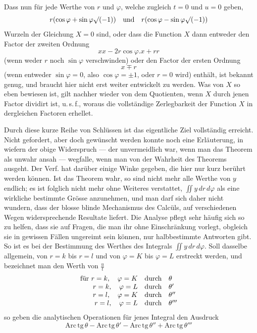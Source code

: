 Dass nun für jede Werthe von $r$ und $\varphi$, welche zugleich $t=0$
und $u=0$ geben,
\[
r(\cos\varphi+\sin\varphi\surd(-1))\quad\hbox{und}\quad
r(\cos\varphi-\sin\varphi\surd(-1))
\]
Wurzeln der Gleichung $X=0$ sind, oder dass die Function $X$ dann
entweder den Factor der zweiten Ordnung
\[
xx-2r\cos\varphi.x+rr
\]
(wenn weder $r$ noch $\sin\varphi$ verschwinden) oder den Factor der
ersten Ordnung
\[
x\mp r
\]
(wenn entweder $\sin\varphi=0$, also $\cos\varphi=\pm1$,
oder $r=0$ wird) enthält, ist bekannt genug, und braucht hier nicht erst
weiter entwickelt zu werden. Was von $X$ so eben bewiesen ist, gilt
nachher wieder von dem Quotienten, wenn $X$ durch jenen Factor dividirt
ist, u.\,s.\,f., woraus die vollständige Zerlegbarkeit der Function $X$ in
dergleichen Factoren erhellet.

Durch diese kurze Reihe von Schlüssen ist das eigentliche Ziel vollständig
erreicht. Nicht gefordert, aber doch gewünscht werden konnte noch eine
Erläuterung, in wiefern der obige Widerspruch --- der unvermeidlich war,
wenn man das Theorem als unwahr ansah --- wegfalle, wenn man von der
Wahrheit des Theorems ausgeht. Der Verf. hat darüber einige Winke gegeben,
die hier nur kurz berührt werden können. Ist das Theorem wahr, so sind
nicht mehr alle Werthe von $y$ endlich; es ist folglich nicht mehr ohne
Weiteres verstattet, $\iint y\,dr\,d\varphi$ als eine wirkliche bestimmte
Grösse anzunehmen, und man darf sich daher nicht wundern, dass der blosse
blinde Mechanismus des Calcüls, auf verschiedenen Wegen widersprechende
Resultate liefert. Die Analyse pflegt sehr häufig sich so zu helfen, dass
sie auf Fragen, die man ihr ohne Einschränkung vorlegt, obgleich sie in
gewissen Fällen ungereimt sein können, nur halbbestimmte Antworten gibt.
So ist es bei der Bestimmung des Werthes des Integrals $\iint y\,dr\,d\varphi$.
Soll dasselbe allgemein, von $r=k$ bis $r=l$ und von $\varphi=K$ bis
$\varphi=L$ erstreckt werden, und bezeichnet man den Werth von $\frac{u}{t}$
\[
\begin{array}{rcl}
\hbox{für }r=k,\quad\varphi=K&\hbox{durch}&\theta\\
r=k,\quad\varphi=L&\hbox{durch}&\theta'\\
r=l,\quad\varphi=K&\hbox{durch}&\theta''\\
r=l,\quad\varphi=L&\hbox{durch}&\theta'''
\end{array}
\]
so geben die analytischen Operationen für jenes Integral den Ausdruck
\[
\mathrm{Arc\,tg}\,\theta-\mathrm{Arc\,tg}\,\theta'
-\mathrm{Arc\,tg}\,\theta''+\mathrm{Arc\,tg}\,\theta'''
\]

